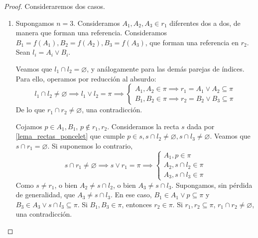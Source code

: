 \begin{proof} %
    Consideraremos dos casos.
    \begin{enumerate}
        \item Supongamos $n = 3$. Consideramos $A_1, A_2, A_3 \in
        r_1$ diferentes dos a dos, de manera que forman una
        referencia. Consideramos $B_1 = f(A_1), B_2 = f(A_2),
        B_3 = f(A_3)$, que forman una referencia en $r_2$.
        Sean $l_i = A_i \vee B_i$.
        
        Veamos que $l_1 \cap l_2 = \varnothing$, y análogamente
        para las demás parejas de índices. Para ello, operamos
        por reducción al absurdo:
        \[
        l_1 \cap l_2 \neq \varnothing \implies l_1 \vee l_2 = \pi
        \implies
        \begin{cases}
        A_1, A_2 \in \pi \implies r_1 = A_1 \vee A_2 \subseteq \pi\\
        B_1, B_2 \in \pi \implies r_2 = B_2 \vee B_3 \subseteq \pi
        \end{cases}
        \]
        De lo que $r_1 \cap r_2 \neq \varnothing$,
        una contradicción.
        
        Cojamos $p \in A_1, B_1$, $p \not \in r_1, r_2$. Consideramos
        la recta $s$ dada por \ref{lema_rectas_poncelet} que cumple
        $p \in s, s \cap l_2 \neq \varnothing, s \cap l_3 \neq 
        \varnothing$. Veamos que $s \cap r_1 = \varnothing$. Si 
        suponemos lo contrario,
        \[
        s \cap r_1 \neq \varnothing \implies s \vee r_1 = \pi
        \implies
        \begin{cases}
        A_1, p \in \pi \\
        A_2, s \cap l_2 \in \pi \\
         A_3, s \cap l_3 \in \pi 
        \end{cases}
        \]
        Como $s \neq r_1$, o bien $A_2 \neq s \cap l_2$, o bien 
         $A_3 \neq s \cap l_3$. Supongamos, sin pérdida de generalidad,
         que $A_3 \neq s \cap l_3$. En ese caso, $B_1 \in A_1 
         \vee p \subseteq \pi$ y $B_3 \in A_3 \vee s \cap l_3 \subseteq
         \pi$. Si $B_1, B_3 \in \pi$, 
         entonces $r_2 \in \pi$. Si $r_1, r_2 \subseteq
         \pi$, $r_1 \cap r_2 \neq \varnothing$, una contradicción.
         

\end{enumerate}
\end{proof}
